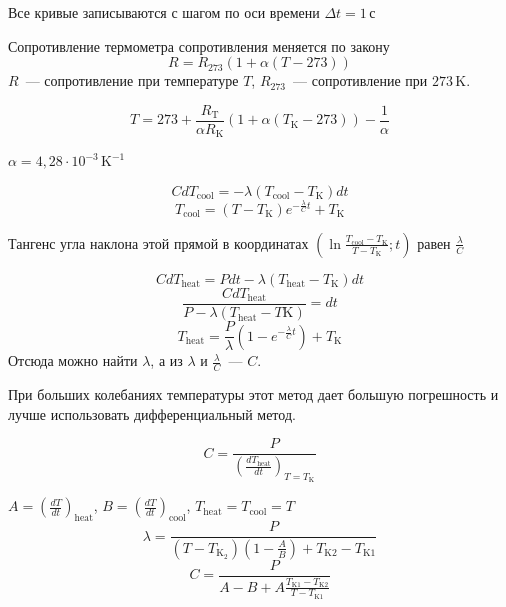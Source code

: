 Все кривые записываются с шагом по оси времени $\Delta t = 1\,\text{с}$

Сопротивление термометра сопротивления меняется по закону
\[R=R_{273}\left(1+\alpha \left(T-273\right)\right)\]
$R$~--- сопротивление при температуре $T$, $R_{273}$~--- сопротивление при $273\,\text{K}$.

\[T=273+\frac{R_\text{T}}{\alpha R_\text{K}}\left(1+\alpha\left(T_{\text{K}}-273\right)\right)-\frac{1}{\alpha}\]

$\alpha=4{,}28\cdot 10^{-3}\,\text{K}^{-1}$

\[CdT_\text{cool}=-\lambda\left(T_\text{cool}-T_\text{K}\right)dt\]
\[T_\text{cool}=\left(T-T_\text{K}\right)e^{-\frac{\lambda}{C}t}+T_\text{K}\]

Тангенс угла наклона этой прямой в координатах $\left(\ln\frac{T_\text{cool}-T_\text{K}}{T-T_\text{K}};t\right)$
равен $\frac{\lambda}{C}$

\[CdT_\text{heat}=Pdt-\lambda\left(T_\text{heat}-T_\text{K}\right)dt\]
\[\frac{CdT_\text{heat}}{P-\lambda\left(T_\text{heat}-T\text{K}\right)}=dt\]
\[T_\text{heat}=\frac{P}{\lambda}\left(1-e^{-\frac{\lambda}{C}t}\right)+T_\text{K}\]
Отсюда можно найти $\lambda$, а из $\lambda$ и $\frac{\lambda}{C}$~--- $C$.

При больших колебаниях температуры этот метод дает большую погрешность и лучше
использовать дифференциальный метод.

\[C=\frac{P}{\left(\frac{dT_\text{heat}}{dt}\right)_{T=T_\text{K}}}\]

$A=\left(\frac{dT}{dt}\right)_\text{heat}$, $B=\left(\frac{dT}{dt}\right)_\text{cool}$,
$T_\text{heat}=T_\text{cool}=T$
\[\lambda=\frac{P}{\left(T-T_{\text{K}_2}\right)\left(1-\frac{A}{B}\right)+T_\text{K2}-T_\text{K1}}\]
\[C=\frac{P}{A-B+A\frac{T_\text{K1}-T_\text{K2}}{T-T_\text{K1}}}\]
